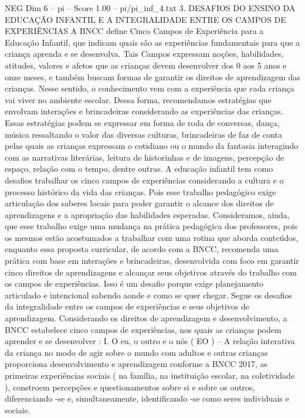 \begin{textsample}{NEG Dim 6 – pi – Score 1.00 – pi/pi\_inf\_4.txt}  \label{ex:f6_neg_091}
3.
DESAFIOS DO ENSINO DA EDUCAÇÃO INFANTIL E A INTEGRALIDADE ENTRE OS CAMPOS DE EXPERIÊNCIAS A BNCC define Cinco Campos de Experiência para a Educação Infantil, que indicam quais são as experiências fundamentais para que a criança aprenda e se desenvolva.
Tais Campos expressam noções, habilidades, atitudes, valores e afetos que as crianças devem desenvolver dos 0 aos 5 anos e onze meses, e também buscam formas de garantir os direitos de aprendizagem das crianças.
Nesse sentido, o conhecimento vem com a experiência que cada criança vai viver no ambiente escolar.
Dessa forma, recomendamos estratégias que envolvam interações e brincadeiras considerando as experiências das crianças.
Essas estratégias podem se expressar em forma de roda de conversas, dança, música ressaltando o valor das diversas culturas, brincadeiras de faz de conta pelas quais as crianças expressam o cotidiano ou o mundo da fantasia interagindo com as narrativas literárias, leitura de historinhas e de imagens, percepção de espaço, relação com o tempo, dentre outras.
A educação infantil tem como desafios trabalhar os cinco campos de experiências considerando a cultura e o processo histórico da vida das crianças.
Pois esse trabalho pedagógico exige articulação dos saberes locais para poder garantir o alcance dos direitos de aprendizagens e a apropriação das habilidades esperadas.
Consideramos, ainda, que esse trabalho exige uma mudança na prática pedagógica dos professores, pois os mesmos estão acostumados a trabalhar com uma rotina que aborda conteúdos, enquanto essa proposta curricular, de acordo com a BNCC, recomenda uma prática com base em interações e brincadeiras, desenvolvida com foco em garantir cinco direitos de aprendizagens e alcançar seus objetivos através do trabalho com os campos de experiências.
Isso é um desafio porque exige planejamento articulado e intencional sabendo aonde e como se quer chegar.
Segue os desafios da integralidade entre os campos de experiências e seus objetivos de aprendizagem.
Considerando os direitos de aprendizagem e desenvolvimento, a BNCC estabelece cinco campos de experiências, nos quais as crianças podem aprender e se desenvolver : I.
O eu, o outro e o nós ( EO ) – A relação interativa da criança no modo de agir sobre o mundo com adultos e outras crianças proporciona desenvolvimento e aprendizagem conforme a BNCC 2017, as primeiras experiências sociais ( na família, na instituição escolar, na coletividade ), constroem percepções e questionamentos sobre si e sobre os outros, diferenciando -se e, simultaneamente, identificando -se como seres individuais e sociais.

\end{textsample}
